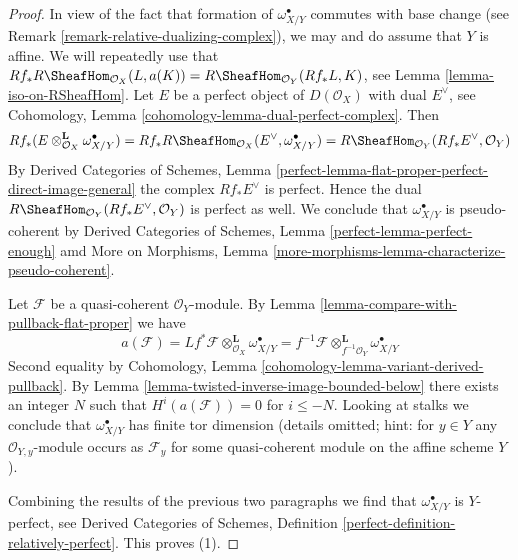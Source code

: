 \begin{proof}
In view of the fact that formation of $\omega_{X/Y}^\bullet$ commutes
with base change (see Remark \ref{remark-relative-dualizing-complex}),
we may and do assume that $Y$ is affine. We will repeatedly use that
$Rf_*R\SheafHom_{\mathcal{O}_X}(L, a(K)) =
R\SheafHom_{\mathcal{O}_Y}(Rf_*L, K)$, see
Lemma \ref{lemma-iso-on-RSheafHom}.
Let $E$ be a perfect object of $D(\mathcal{O}_X)$
with dual $E^\vee$, see Cohomology, Lemma
\ref{cohomology-lemma-dual-perfect-complex}.
Then
$$
Rf_*(E \otimes_{\mathcal{O}_X}^\mathbf{L} \omega_{X/Y}^\bullet) =
Rf_*R\SheafHom_{\mathcal{O}_X}(E^\vee, \omega_{X/Y}^\bullet) =
R\SheafHom_{\mathcal{O}_Y}(Rf_*E^\vee, \mathcal{O}_Y)
$$
By Derived Categories of Schemes, Lemma
\ref{perfect-lemma-flat-proper-perfect-direct-image-general}
the complex $Rf_*E^\vee$ is perfect.
Hence the dual $R\SheafHom_{\mathcal{O}_Y}(Rf_*E^\vee, \mathcal{O}_Y)$
is perfect as well. We conclude that $\omega_{X/Y}^\bullet$
is pseudo-coherent by
Derived Categories of Schemes, Lemma
\ref{perfect-lemma-perfect-enough} amd
More on Morphisms, Lemma
\ref{more-morphisms-lemma-characterize-pseudo-coherent}.

\medskip\noindent
Let $\mathcal{F}$ be a quasi-coherent $\mathcal{O}_Y$-module. By
Lemma \ref{lemma-compare-with-pullback-flat-proper} we have
$$
a(\mathcal{F}) =
Lf^*\mathcal{F} \otimes_{\mathcal{O}_X}^\mathbf{L} \omega_{X/Y}^\bullet =
f^{-1}\mathcal{F} \otimes_{f^{-1}\mathcal{O}_Y}^\mathbf{L} \omega_{X/Y}^\bullet
$$
Second equality by Cohomology, Lemma
\ref{cohomology-lemma-variant-derived-pullback}.
By Lemma \ref{lemma-twisted-inverse-image-bounded-below}
there exists an integer $N$ such that
$H^i(a(\mathcal{F})) = 0$ for $i \leq -N$.
Looking at stalks we conclude that $\omega_{X/Y}^\bullet$ has finite
tor dimension (details omitted; hint: for $y \in Y$ any
$\mathcal{O}_{Y, y}$-module occurs as $\mathcal{F}_y$
for some quasi-coherent module on the affine scheme $Y$).

\medskip\noindent
Combining the results of the previous two paragraphs we find that
$\omega_{X/Y}^\bullet$ is $Y$-perfect, see
Derived Categories of Schemes, Definition
\ref{perfect-definition-relatively-perfect}.
This proves (1).


\end{proof}
